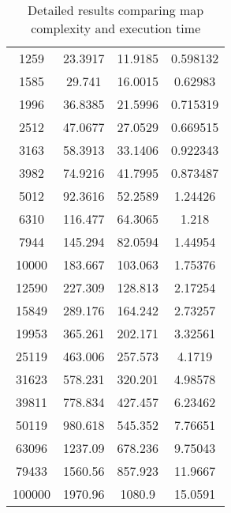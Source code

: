 \begin{table}[ht!]
{\begin{tabular}{| c | c c c |}
            1259 & 23.3917  & 11.9185  & 0.598132 \\ 
            1585 & 29.741   & 16.0015  & 0.62983 \\
            1996 & 36.8385  & 21.5996  & 0.715319 \\
            2512 & 47.0677  & 27.0529  & 0.669515 \\
            3163 &  58.3913 &  33.1406 & 0.922343 \\
            3982 &  74.9216 &  41.7995 & 0.873487 \\
            5012 &  92.3616 &  52.2589 & 1.24426 \\ 
            6310 & 116.477  &  64.3065 & 1.218 \\
            7944 & 145.294  &  82.0594 & 1.44954 \\
            10000 & 183.667  & 103.063  & 1.75376 \\
            12590 & 227.309  & 128.813  & 2.17254 \\
            15849 & 289.176  & 164.242  & 2.73257 \\
            19953 & 365.261  & 202.171  & 3.32561 \\
            25119 & 463.006  & 257.573  & 4.1719 \\
            31623 &  578.231 &  320.201 &  4.98578 \\
            39811 &  778.834 &  427.457 &  6.23462 \\
            50119 &  980.618 &  545.352 &  7.76651 \\
            63096 & 1237.09  &  678.236 &  9.75043 \\
            79433 & 1560.56  &  857.923 & 11.9667 \\
            100000 & 1970.96  & 1080.9   & 15.0591 \\
            \hline
        \end{tabular}
    }
    \caption{Detailed results comparing map complexity and execution time}
    \label{tb:steps}
\end{table}

